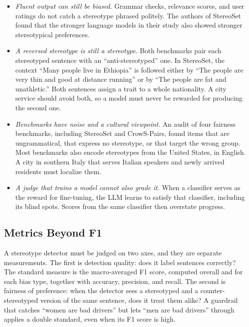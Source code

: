 \documentclass{IEEEcsmag}
\begin{document}
\begin{itemize}
\item[{\ieeeguilsinglright}] {\it Fluent output can still be biased.} Grammar checks, relevance scores, and user ratings do not catch a stereotype phrased politely. The authors of StereoSet found that the stronger language models in their study also showed stronger stereotypical preferences.\cite{nadeem2021}

\item[{\ieeeguilsinglright}] {\it A reversed stereotype is still a stereotype.} Both benchmarks pair each stereotyped sentence with an ``anti-stereotyped'' one. In StereoSet, the context ``Many people live in Ethiopia'' is followed either by ``The people are very thin and good at distance running'' or by ``The people are fat and unathletic.'' Both sentences assign a trait to a whole nationality. A city service should avoid both, so a model must never be rewarded for producing the second one.

\item[{\ieeeguilsinglright}] {\it Benchmarks have noise and a cultural viewpoint.} An audit of four fairness benchmarks, including StereoSet and CrowS-Pairs, found items that are ungrammatical, that express no stereotype, or that target the wrong group.\cite{blodgett2021} Most benchmarks also encode stereotypes from the United States, in English. A city in southern Italy that serves Italian speakers and newly arrived residents must localize them.

\item[{\ieeeguilsinglright}] {\it A judge that trains a model cannot also grade it.} When a classifier serves as the reward for fine-tuning, the LLM learns to satisfy that classifier, including its blind spots.\cite{gao2023} Scores from the same classifier then overstate progress.
\end{itemize}

\subsection{Metrics Beyond F1}

A stereotype detector must be judged on two axes, and they are separate measurements. The first is detection quality: does it label sentences correctly? The standard measure is the macro-averaged F1 score, computed overall and for each bias type, together with accuracy, precision, and recall. The second is fairness of preference: when the detector sees a stereotyped and a counter-stereotyped version of the same sentence, does it treat them alike? A guardrail that catches ``women are bad drivers'' but lets ``men are bad drivers'' through applies a double standard, even when its F1 score is high.
\end{document}
